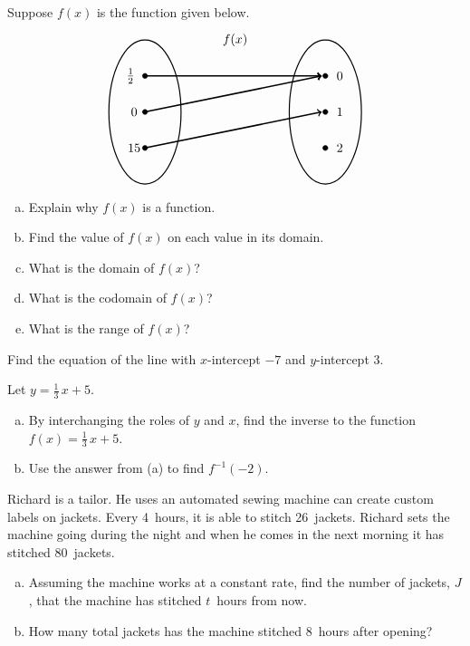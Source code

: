 \documentclass[11pt,letterpaper]{article}
\begin{document}
\prob Suppose $f(x)$ is the function given below.
	\[
	\begin{tikzpicture}
	\node at (2.5,2) {$f(x)$};
	\draw[line width=0.03cm] (0,0) circle (1 and 2);
	\draw[line width=0.03cm] (5,0) circle (1 and 2);
	
	\draw[fill=black] (0,1) circle (0.07);
	\draw[fill=black] (0,0) circle (0.07);
	\draw[fill=black] (0,-1) circle (0.07);
	
	\draw[fill=black] (5,1) circle (0.07);
	\draw[fill=black] (5,0) circle (0.07);
	\draw[fill=black] (5,-1) circle (0.07);
	
	\draw[line width=0.04cm,->] (0,1) -- (4.9,1);
	\draw[line width=0.04cm,->] (0,0) -- (4.9,1);
	\draw[line width=0.04cm,->] (0,-1) -- (4.9,0);
	
	\node at (-0.4,1) {$\frac{1}{2}$};
	\node at (-0.3,0) {$0$};
	\node at (-0.3,-1) {$15$};
	
	\node at (5.4,1) {$0$};
	\node at (5.4,0) {$1$};
	\node at (5.4,-1) {$2$};
	\end{tikzpicture}
	\]

\begin{enumerate}[(a)]
\item Explain why $f(x)$ is a function.
\item Find the value of $f(x)$ on each value in its domain. 
\item What is the domain of $f(x)$?
\item What is the codomain of $f(x)$?
\item What is the range of $f(x)$?
\end{enumerate} \pspace


\prob Find the equation of the line with $x$-intercept $-7$ and $y$-intercept 3. \pspace 


\prob Let $y= \frac{1}{3}\,x + 5$.
	\begin{enumerate}[(a)]
	\item By interchanging the roles of $y$ and $x$, find the inverse to the function $f(x)= \frac{1}{3}\,x + 5$.
	\item Use the answer from (a) to find $f^{-1}(-2)$. 
	\end{enumerate} \pspace


\prob Richard is a tailor. He uses an automated sewing machine can create custom labels on jackets. Every 4~hours, it is able to stitch 26~jackets. Richard sets the machine going during the night and when he comes in the next morning it has stitched 80~jackets.
	\begin{enumerate}[(a)]
	\item Assuming the machine works at a constant rate, find the number of jackets, $J$, that the machine has stitched $t$~hours from now.
	\item How many total jackets has the machine stitched 8~hours after opening?
	\end{enumerate} \pspace
\end{document}
